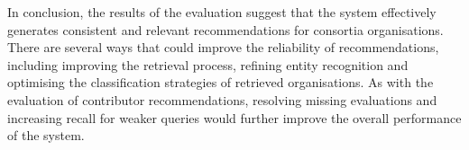 In conclusion, the results of the evaluation suggest that the system effectively generates consistent and relevant recommendations for consortia organisations.
There are several ways that could improve the reliability of recommendations, including improving the retrieval process, refining entity recognition and optimising the classification strategies of retrieved organisations.
As with the evaluation of contributor recommendations, resolving missing evaluations and increasing recall for weaker queries would further improve the overall performance of the system.